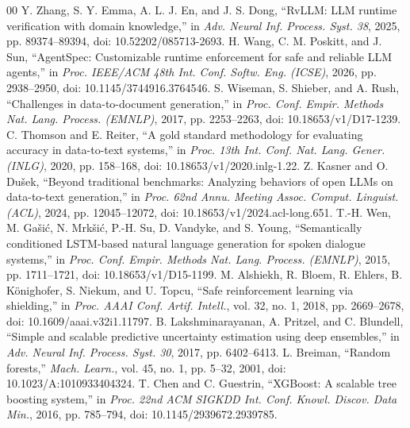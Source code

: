 \documentclass[conference]{IEEEtran}
\begin{document}
\begin{thebibliography}{00}
 Y. Zhang, S. Y. Emma, A. L. J. En, and J. S. Dong, ``RvLLM: LLM runtime verification with domain knowledge,'' in \textit{Adv. Neural Inf. Process. Syst. 38}, 2025, pp. 89374--89394, doi: 10.52202/085713-2693.
 H. Wang, C. M. Poskitt, and J. Sun, ``AgentSpec: Customizable runtime enforcement for safe and reliable LLM agents,'' in \textit{Proc. IEEE/ACM 48th Int. Conf. Softw. Eng. (ICSE)}, 2026, pp. 2938--2950, doi: 10.1145/3744916.3764546.
 S. Wiseman, S. Shieber, and A. Rush, ``Challenges in data-to-document generation,'' in \textit{Proc. Conf. Empir. Methods Nat. Lang. Process. (EMNLP)}, 2017, pp. 2253--2263, doi: 10.18653/v1/D17-1239.
 C. Thomson and E. Reiter, ``A gold standard methodology for evaluating accuracy in data-to-text systems,'' in \textit{Proc. 13th Int. Conf. Nat. Lang. Gener. (INLG)}, 2020, pp. 158--168, doi: 10.18653/v1/2020.inlg-1.22.
 Z. Kasner and O. Du\v{s}ek, ``Beyond traditional benchmarks: Analyzing behaviors of open LLMs on data-to-text generation,'' in \textit{Proc. 62nd Annu. Meeting Assoc. Comput. Linguist. (ACL)}, 2024, pp. 12045--12072, doi: 10.18653/v1/2024.acl-long.651.
 T.-H. Wen, M. Ga\v{s}i\'{c}, N. Mrk\v{s}i\'{c}, P.-H. Su, D. Vandyke, and S. Young, ``Semantically conditioned LSTM-based natural language generation for spoken dialogue systems,'' in \textit{Proc. Conf. Empir. Methods Nat. Lang. Process. (EMNLP)}, 2015, pp. 1711--1721, doi: 10.18653/v1/D15-1199.
 M. Alshiekh, R. Bloem, R. Ehlers, B. K\"{o}nighofer, S. Niekum, and U. Topcu, ``Safe reinforcement learning via shielding,'' in \textit{Proc. AAAI Conf. Artif. Intell.}, vol. 32, no. 1, 2018, pp. 2669--2678, doi: 10.1609/aaai.v32i1.11797.
 B. Lakshminarayanan, A. Pritzel, and C. Blundell, ``Simple and scalable predictive uncertainty estimation using deep ensembles,'' in \textit{Adv. Neural Inf. Process. Syst. 30}, 2017, pp. 6402--6413.
 L. Breiman, ``Random forests,'' \textit{Mach. Learn.}, vol. 45, no. 1, pp. 5--32, 2001, doi: 10.1023/A:1010933404324.
 T. Chen and C. Guestrin, ``XGBoost: A scalable tree boosting system,'' in \textit{Proc. 22nd ACM SIGKDD Int. Conf. Knowl. Discov. Data Min.}, 2016, pp. 785--794, doi: 10.1145/2939672.2939785.
\end{thebibliography}
\end{document}

